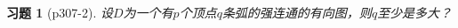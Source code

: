 \documentclass{article}
\begin{document}
\begin{CJK}{UTF8}{gbsn}
  \newtheorem*{Exercise}{习题}
  \huge
\begin{Exercise}[p307-2]
  设$D$为一个有$p$个顶点$q$条弧的强连通的有向图，则$q$至少是多大？
\end{Exercise}

\end{CJK}
\end{document}
